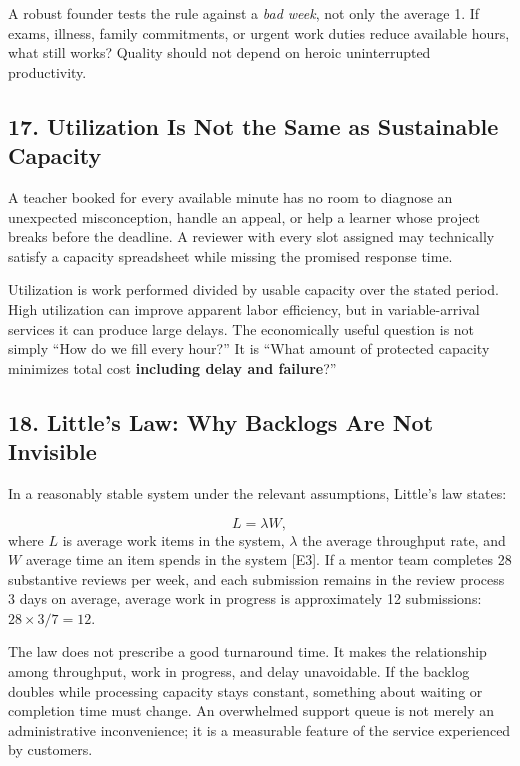 A robust founder tests the rule against a \emph{bad week}, not only the average 1. If exams, illness, family commitments, or urgent work duties reduce available hours, what still works? Quality should not depend on heroic uninterrupted productivity.

\subsection*{17. Utilization Is Not the Same as Sustainable Capacity}

A teacher booked for every available minute has no room to diagnose an unexpected misconception, handle an appeal, or help a learner whose project breaks before the deadline. A reviewer with every slot assigned may technically satisfy a capacity spreadsheet while missing the promised response time.

Utilization is work performed divided by usable capacity over the stated period. High utilization can improve apparent labor efficiency, but in variable-arrival services it can produce large delays. The economically useful question is not simply ``How do we fill every hour?'' It is ``What amount of protected capacity minimizes total cost \textbf{including delay and failure}?''

\subsection*{18. Little's Law: Why Backlogs Are Not Invisible}

In a reasonably stable system under the relevant assumptions, Little's law states:

\begin{equation}
L = \lambda W,
\end{equation}
where $L$ is average work items in the system, $\lambda$ the average throughput rate, and $W$ average time an item spends in the system [E3]. If a mentor team completes 28 substantive reviews per week, and each submission remains in the review process 3 days on average, average work in progress is approximately 12 submissions: $28 \times 3/7 = 12$.

The law does not prescribe a good turnaround time. It makes the relationship among throughput, work in progress, and delay unavoidable. If the backlog doubles while processing capacity stays constant, something about waiting or completion time must change. An overwhelmed support queue is not merely an administrative inconvenience; it is a measurable feature of the service experienced by customers.

